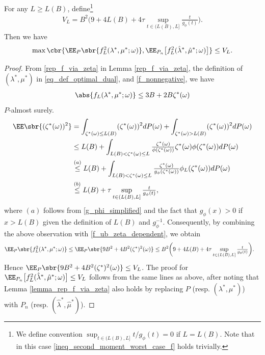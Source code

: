 \documentclass[9pt]{article} %
\numberwithin{equation}{section}
\renewcommand{\frac}[2]{\tfrac{#1}{#2}}
\begin{document}
\begin{lemma}\label{lemma_refined_variance}
For any $L \geq L(B)$, define\footnote{
We define convention $ \sup_{t \in (L(B), L] } {t}/{g_\phi (t)} = 0$ if $L = L(B)$.
Note that in this case \eqref{ineq_second_moment_worst_case_f} holds trivially. 
} 
\begin{align}\label{def_var_proxy}
V_L = B^2 \bigg({9 + 4 L(B) + 4 \tau \sup_{t \in (L(B), L] } \frac{t}{g_\phi (t)}} \bigg).
\end{align}
Then we have 
\begin{align}\label{ineq_refined_var}
 \max \cbr{\EE_P \sbr{ f_{L}^2 (\lambda^*,\mu^*; \omega) }, \EE_{P_n} \big[{ f_{L}^2 (\hat{\lambda}^*,\hat{\mu}^*; \omega)  \big]} 
}  \leq V_L.
\end{align}
\end{lemma}

\begin{proof}
From \eqref{rep_f_via_zeta} in Lemma \ref{rep_f_via_zeta}, the definition of $(\lambda^*, \mu^*)$ in \eqref{eq_def_optimal_dual}, and \eqref{f_nonnegative}, we have  
\begin{align}\label{f_ub_zeta_dependent}
\abs{f_L(\lambda^*, \mu^*; \omega) }
\leq 3B + 2B  \zeta^*(\omega)
\end{align}
$P$-almost surely.
\begin{align*}
\EE \sbr{ (\zeta^*(\omega) )^2} 
&= \int_{\zeta^*(\omega) \leq L(B)} (\zeta^*(\omega) )^2   dP(\omega) + \int_{\zeta^*(\omega) > L(B)} (\zeta^*(\omega) )^2   dP(\omega)  \\
& \leq L(B) + \int_{ L(B) < \zeta^*(\omega) \leq L } \frac{\zeta^*(\omega)}{\phi(\zeta^*(\omega))} \zeta^*(\omega) \phi(\zeta^*(\omega)) dP(\omega)  \\
& \overset{(a)}{\leq} L(B) +  \int_{ L(B) < \zeta^*(\omega) \leq L } \frac{\zeta^*(\omega)}{g_\phi(\zeta^*(\omega))}  \phi_L(\zeta^*(\omega)) dP(\omega) \\
&  \overset{(b)}{\leq}  L(B) +   \tau    \sup_{t \in (L(B), L] } \frac{t}{g_\phi (t)},
\end{align*}
where $(a)$ follows from \eqref{g_phi_simplified} and the fact that $g_\phi(x) > 0$ if $x > L(B)$ given the definition of $L(B)$ and $g_\phi^{-1}$. 
Consequently, by combining the above observation with \eqref{f_ub_zeta_dependent}, we obtain 
\begin{align}\label{ineq_second_moment_worst_case_f}
\EE_P \sbr{ f_{L}^2 (\lambda^*,\mu^*; \omega) } 
&  \leq \EE_P \sbr{ 9B^2 + 4B^2 (\zeta^*)^2 (\omega)}  \leq
B^2 \bigg({
9 + 4 L(B) + 4 \tau   \sup_{t \in (L(B), L] } \frac{t}{g_\phi (t)}
} \bigg).
\end{align}
Hence $\EE_P \sbr{ 9B^2 + 4B^2 (\zeta^*)^2 (\omega)} \leq V_L$. 
The proof for $\EE_{P_n} \big[{ f_{L}^2 (\hat{\lambda}^*,\hat{\mu}^*; \omega)}\big]  \leq V_L$ follows from the same lines as above, after noting that Lemma \ref{lemma_rep_f_via_zeta} also holds by replacing $P$ (resp. $(\lambda^*, \mu^*)$) with 
$P_n$ (resp. $(\hat{\lambda}^*, \hat{\mu}^*)$).  
\end{proof}
\end{document}
